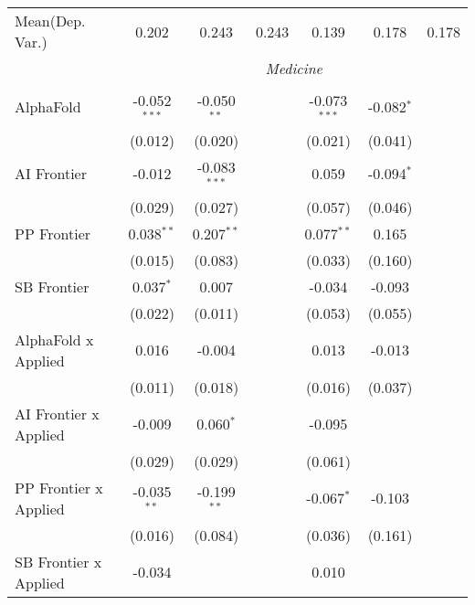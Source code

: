 \begin{tabular}{lcccccc}
Mean(Dep. Var.) & 0.202 & 0.243 & 0.243 & 0.139 & 0.178 & 0.178 \\
 & \multicolumn{6}{c}{\textit{Medicine}} \\ \\
   AlphaFold                      & -0.052$^{***}$ & -0.050$^{**}$  &                & -0.073$^{***}$ & -0.082$^{*}$ &   \\   
                                  & (0.012)        & (0.020)        &                & (0.021)        & (0.041)      &   \\   
   AI Frontier                    & -0.012         & -0.083$^{***}$ &                & 0.059          & -0.094$^{*}$ &   \\   
                                  & (0.029)        & (0.027)        &                & (0.057)        & (0.046)      &   \\   
   PP Frontier                    & 0.038$^{**}$   & 0.207$^{**}$   &                & 0.077$^{**}$   & 0.165        &   \\   
                                  & (0.015)        & (0.083)        &                & (0.033)        & (0.160)      &   \\   
   SB Frontier                    & 0.037$^{*}$    & 0.007          &                & -0.034         & -0.093       &   \\   
                                  & (0.022)        & (0.011)        &                & (0.053)        & (0.055)      &   \\   
   AlphaFold x Applied            & 0.016          & -0.004         &                & 0.013          & -0.013       &   \\   
                                  & (0.011)        & (0.018)        &                & (0.016)        & (0.037)      &   \\   
   AI Frontier x Applied          & -0.009         & 0.060$^{*}$    &                & -0.095         &              &   \\   
                                  & (0.029)        & (0.029)        &                & (0.061)        &              &   \\   
   PP Frontier x Applied          & -0.035$^{**}$  & -0.199$^{**}$  &                & -0.067$^{*}$   & -0.103       &   \\   
                                  & (0.016)        & (0.084)        &                & (0.036)        & (0.161)      &   \\   
   SB Frontier x Applied          & -0.034         &                &                & 0.010          &              &   \\   

\end{tabular}
